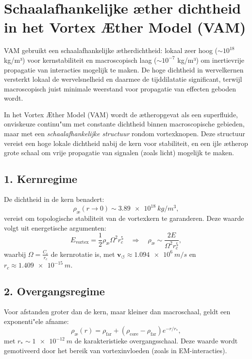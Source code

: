 
\section*{Schaalafhankelijke æther dichtheid in het Vortex Æther Model (VAM)}


VAM gebruikt een schaalafhankelijke ætherdichtheid: lokaal zeer hoog ($\sim10^{18}$ kg/m³) voor kernstabiliteit en macroscopisch laag ($\sim10^{-7}$ kg/m³) om inertievrije propagatie van interacties mogelijk te maken. De hoge dichtheid in wervelkernen versterkt lokaal de wervelsnelheid en daarmee de tijddilatatie significant, terwijl macroscopisch juist minimale weerstand voor propagatie van effecten geboden wordt.


In het Vortex Æther Model (VAM) wordt de ætheropgevat als een superfluide, onviskeuze continu"um met constante dichtheid binnen macroscopische gebieden, maar met een \emph{schaalafhankelijke structuur} rondom vortexknopen. Deze structuur vereist een hoge lokale dichtheid nabij de kern voor stabiliteit, en een ijle ætherop grote schaal om vrije propagatie van signalen (zoals licht) mogelijk te maken.

\subsection*{1. Kernregime}

De dichtheid in de kern benadert:
\begin{equation}
    \rho_\text{\ae}(r \to 0) \sim \SI{3.89e18}{kg/m^3},
\end{equation}
vereist om topologische stabiliteit van de vortexkern te garanderen. Deze waarde volgt uit energetische argumenten:
\begin{equation}
    E_{\text{vortex}} = \frac{1}{2} \rho_\text{\ae} \Omega^2 r_c^5 \quad\Rightarrow\quad \rho_\text{\ae} \sim \frac{2 E}{\Omega^2 r_c^5},
\end{equation}
waarbij \( \Omega = \frac{C_e}{r_c} \) de kernrotatie is, met \( \mathbf{v}_{\scriptscriptstyle\boldsymbol{\circlearrowleft}} \approx \SI{1.094e6}{m/s} \) en \( r_c \approx \SI{1.409e-15}{m} \).

\subsection*{2. Overgangsregime}

Voor afstanden groter dan de kern, maar kleiner dan macroschaal, geldt een exponenti"ele afname:
\begin{equation}
    \rho_\text{\ae}(r) = \rho_\text{far} + (\rho_\text{core} - \rho_\text{far}) e^{-r/r_*},
\end{equation}
met \( r_* \sim \SI{1e-12}{m} \) de karakteristieke overgangsschaal. Deze waarde wordt gemotiveerd door het bereik van vortexinvloeden (zoals in EM-interacties).

